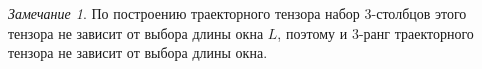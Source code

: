 \documentclass[specialist,
    substylefile = spbu.rtx,
    subf,href,colorlinks=true, 12pt]{disser}
\theoremstyle{plain}
\theoremstyle{definition}
\newtheorem{definition}{Определение}[section]
\theoremstyle{remark}
\newtheorem*{remark}{Замечание}
\begin{document}

%

    \begin{remark}
        По построению траекторного тензора набор 3-столбцов этого тензора
        не зависит от выбора длины окна $L$, поэтому и $3$-ранг траекторного тензора не зависит от выбора
        длины окна.
    \end{remark}
\end{document}
